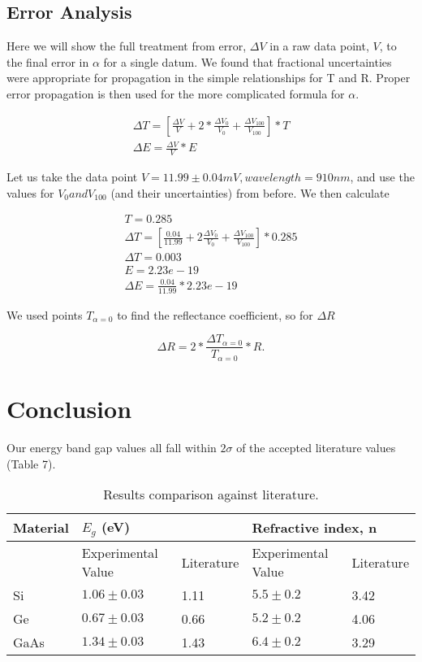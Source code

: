 \documentclass{article}
\begin{document}
\subsection{Error Analysis}

Here we will show the full treatment from error, $\Delta V$ in a raw data point, $V$, to the final error in $\alpha$ for a single datum. We found that fractional uncertainties were appropriate for propagation in the simple relationships for T and R. Proper error propagation is then used for the more complicated formula for $\alpha$.

\begin{gather}
	\Delta T =  [\frac{\Delta V}{V} + 2*\frac{\Delta V_0}{V_0} + \frac{\Delta V_{100}}{V_{100}}] * T \\
	\Delta E = \frac{\Delta V}{V} * E
\end{gather}

Let us take the data point $V =  11.99 \pm 0.04mV, wavelength = 910nm$, and use the values for $V_0 and V_{100}$ (and their uncertainties) from before. We then calculate

\begin{gather}
	T = 0.285 \\
	\Delta T =  [\frac{0.04}{11.99} + 2\frac{\Delta V_0}{V_0} + \frac{\Delta V_{100}}{V_{100}}] * 0.285 \\
	\Delta T = 0.003 \\
	E = 2.23e-19 \\
	\Delta E = \frac{0.04}{11.99} * 2.23e-19
\end{gather}

We used points $T_{\alpha=0}$ to find the reflectance coefficient, so for $\Delta R$

\begin{equation}
	\Delta R = 2 * \frac{\Delta T_{\alpha=0}}{T_{\alpha=0}} * R.
\end{equation}


\section{Conclusion}

Our energy band gap values all fall within $2\sigma$ of the accepted literature values (Table 7).

\begin{table}[]
\centering
\caption{Results comparison against literature.}
\label{my-label}
\begin{tabular}{@{}lllll@{}}
\toprule
Material & \multicolumn{2}{l}{$E_g$ (eV)}  & \multicolumn{2}{l}{Refractive index, n} \\ \midrule
         & Experimental Value & Literature \cite{gaps} & Experimental Value     & Literature  \cite{refractive}   \\
Si       & $1.06 \pm 0.03$    & 1.11       & $5.5 \pm 0.2$          & 3.42           \\
Ge       & $0.67 \pm 0.03$    & 0.66       & $5.2 \pm 0.2$          & 4.06           \\
GaAs     & $1.34 \pm 0.03$    & 1.43       & $6.4 \pm 0.2$          & 3.29           \\ \bottomrule
\end{tabular}
\end{table}
\end{document}
